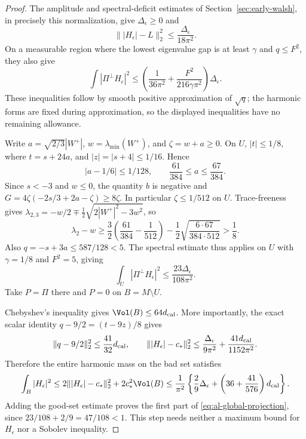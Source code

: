 \begin{proof}
The amplitude and spectral-deficit estimates of
Section~\ref{sec:early-walsh}, in precisely this normalization, give
$\Delta_\epsilon\ge0$ and
\begin{equation}\label{eq:al-phase-input}
 \||H_\epsilon|-L\|_2^2\le\frac{\Delta_\epsilon}{18\pi^2}.
\end{equation}
On a measurable region where the lowest eigenvalue gap is at least
$\gamma$ and $q\le F^2$, they also give
\[
 \int|\Pi^\perp H_\epsilon|^2
 \le\left(\frac1{36\pi^2}
                  +\frac{F^2}{216\gamma\pi^2}\right)\Delta_\epsilon.
\]
These inequalities follow by smooth positive approximation of
$\sqrt q$; the harmonic forms are fixed during approximation, so the
displayed inequalities have no remaining allowance.

Write $a=\sqrt{2/3}|W^+|$, $w=\lambda_{\min}(W^+)$, and
$\zeta=w+a\ge0$.  On $U$, $|t|\le1/8$, where $t=s+24a$, and
$|z|=|s+4|\le1/16$.  Hence
\[
 |a-1/6|\le1/128,\qquad \frac{61}{384}\le a\le\frac{67}{384}.
\]
Since $s<-3$ and $w\le0$, the quantity $b$ is negative and
$G=4\zeta(-2s/3+2a-\zeta)\ge8\zeta$.
In particular $\zeta\le1/512$ on $U$.  Trace-freeness gives
$\lambda_{2,3}=-w/2\mp\tfrac12\sqrt{2|W^+|^2-3w^2}$, so
\[
 \lambda_2-w
 \ge\frac32\left(\frac{61}{384}-\frac1{512}\right)
       -\frac12\sqrt{\frac{6\cdot67}{384\cdot512}}>\frac18.
\]
Also $q=-s+3a\le587/128<5$.  The spectral estimate thus applies on
$U$ with $\gamma=1/8$ and $F^2=5$, giving
\[
 \int_U|\Pi^\perp H_\epsilon|^2
       \le\frac{23\Delta_\epsilon}{108\pi^2}.
\]
Take $P=\Pi$ there and $P=0$ on $B=M\setminus U$.

Chebyshev's inequality gives $\Vol(B)\le64d_{\rm cal}$.  More
importantly, the exact scalar identity $q-9/2=(t-9z)/8$ gives
\[
 \|q-9/2\|_2^2\le\frac{41}{32}d_{\rm cal},\qquad
 \||H_\epsilon|-c_*\|_2^2
 \le\frac{\Delta_\epsilon}{9\pi^2}
                +\frac{41d_{\rm cal}}{1152\pi^2}.
\]
Therefore the entire harmonic mass on the bad set satisfies
\[
 \int_B|H_\epsilon|^2
 \le2\||H_\epsilon|-c_*\|_2^2+2c_*^2\Vol(B)
 \le\frac1{\pi^2}\left\{\frac29\Delta_\epsilon
                       +\left(36+\frac{41}{576}\right)d_{\rm cal}\right\}.
\]
Adding the good-set estimate proves the first part of
\eqref{eq:al-global-projection}, since $23/108+2/9=47/108<1$.
This step needs neither a maximum bound for $H_\epsilon$ nor a
Sobolev inequality.


\end{proof}
